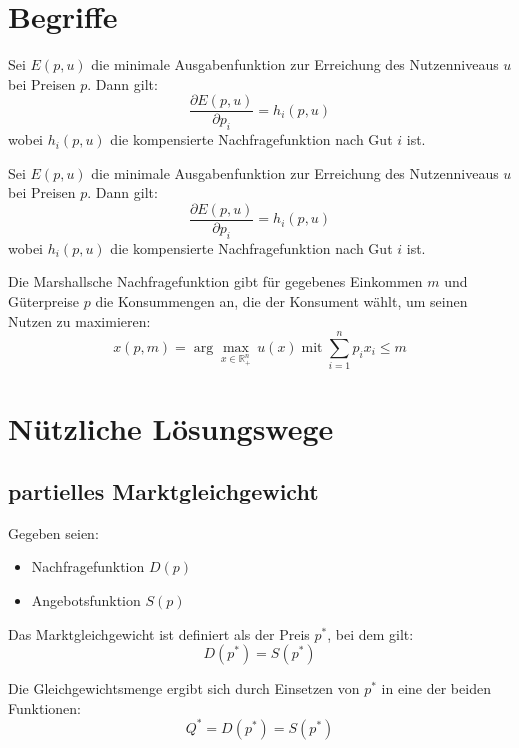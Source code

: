 \chapter{Begriffe}


\begin{lemma} 
	Sei \( E(p, u) \) die minimale Ausgabenfunktion zur Erreichung des Nutzenniveaus \( u \) bei Preisen \( p \). Dann gilt:
	\[
		\frac{\partial E(p, u)}{\partial p_i} = h_i(p, u)
	\]
	wobei \( h_i(p, u) \) die kompensierte Nachfragefunktion nach Gut \( i \) ist.
\end{lemma}
\begin{lemma}
	Sei \( E(p, u) \) die minimale Ausgabenfunktion zur Erreichung des Nutzenniveaus \( u \) bei Preisen \( p \). Dann gilt:
	\[
		\frac{\partial E(p, u)}{\partial p_i} = h_i(p, u)
	\]
	wobei \( h_i(p, u) \) die kompensierte Nachfragefunktion nach Gut \( i \) ist.
\end{lemma}

\begin{definition} 
	Die Marshallsche Nachfragefunktion gibt für gegebenes Einkommen \( m \) und Güterpreise \( p \) die Konsummengen an, die der Konsument wählt, um seinen Nutzen zu maximieren:
	\[
		x(p, m) = \arg\max_{x \in \mathbb{R}^n_+} \, u(x) \; \text{mit} \; \sum_{i=1}^n p_i x_i \leq m
	\]
\end{definition}






\chapter{Nützliche Lösungswege}

\section{partielles Marktgleichgewicht}

Gegeben seien:
\begin{itemize}
    \item Nachfragefunktion \( D(p) \)
    \item Angebotsfunktion \( S(p) \)
\end{itemize}

Das Marktgleichgewicht ist definiert als der Preis \( p^* \), bei dem gilt:
\[
D(p^*) = S(p^*)
\]

Die Gleichgewichtsmenge ergibt sich durch Einsetzen von \( p^* \) in eine der beiden Funktionen:
\[
Q^* = D(p^*) = S(p^*)
\]

